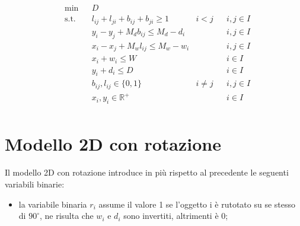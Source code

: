\begin{equation}
	\begin{aligned}
		& \underset{}{\text{min}} & & D\\
		  & \text{s.t.} &   & l_{ij} + l_{ji} + b_{ij} + b_{ji} \geq 1 & i < j    &   & i,j \in I \\
		  &             &   & y_i - y_j + M_d b_{ij} \leq M_d - d_i    &          &   & i,j \in I \\
		  &             &   & x_i - x_j + M_w l_{ij} \leq M_w - w_i    &          &   & i,j \in I \\
		  &             &   & x_i + w_i \leq W                         &          &   & i \in I   \\
		  &             &   & y_i + d_i \leq D                         &          &   & i \in I   \\
		  &             &   & b_{ij}, l_{ij} \in \{0,1\}               & i \neq j &   & i,j \in I \\
		  &             &   & x_{i}, y_{i} \in \mathbb{R}^{+}          &          &   & i \in I   \\
	\end{aligned}
\end{equation}

\newpage

\section{Modello 2D con rotazione}
Il modello 2D con rotazione introduce in più rispetto al precedente le seguenti variabili binarie:
\begin{itemize}
	\item la variabile binaria $r_{i}$ assume il valore 1 se l'oggetto i è rutotato su se stesso di $90^{\circ}$, ne risulta che $w_{i}$ e $d_{i}$ sono invertiti, altrimenti è 0;
\end{itemize}


